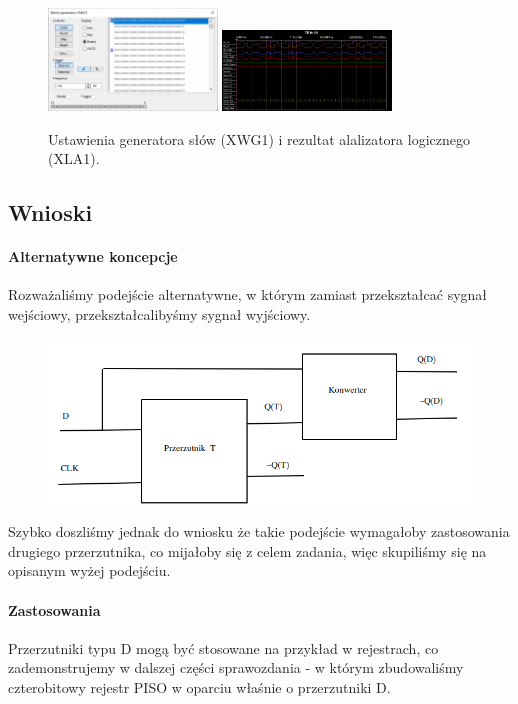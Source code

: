 \documentclass{article}
\begin{document}
\begin{figure}[H]
\caption{Ustawienia generatora słów (XWG1) i rezultat alalizatora logicznego (XLA1).}
\includegraphics[width = 0.4\textwidth]{2agen}
\includegraphics[width = 0.4\textwidth]{2aana}
\end{figure}
\newpage
\subsection{Wnioski}
\paragraph{Alternatywne koncepcje}
Rozważaliśmy podejście alternatywne, w którym zamiast przekształcać sygnał wejściowy, przekształcalibyśmy sygnał wyjściowy.
\begin{figure}[H]
\includegraphics[width = \textwidth]{2afail}
\end{figure}
 Szybko doszliśmy jednak do wniosku że takie podejście wymagałoby zastosowania drugiego przerzutnika, co mijałoby się z celem zadania, więc skupiliśmy się na opisanym wyżej podejściu.
\paragraph{Zastosowania}
Przerzutniki typu D mogą być stosowane na przykład w rejestrach, co zademonstrujemy w dalszej części sprawozdania - w którym zbudowaliśmy czterobitowy rejestr PISO w oparciu właśnie o przerzutniki D.
\end{document}
